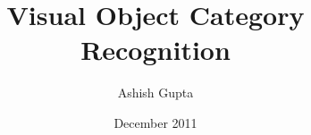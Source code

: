 
\graphicspath{{./figs/png/}{./figs/eps/}{./figs/pdf/}}
\begin{titlepage}
\author{Ashish Gupta}
\title{Visual Object Category Recognition}
\date{December 2011}
\maketitle
\end{titlepage}



